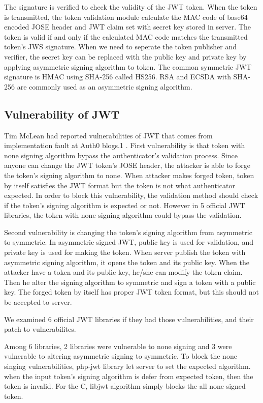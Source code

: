 \documentclass[journal,article,submit,moreauthors,pdftex,10pt,a4paper]{mdpi}
\begin{document}
The signature is verified to check the validity of the JWT token. When the token is transmitted, the token validation module calculate the MAC code of base64 encoded JOSE header and JWT claim set with secret key stored in server. The token is valid if and only if the calculated MAC code matches the transmitted token's JWS signature. When we need to seperate the token publisher and verifier, the secret key can be replaced with the public key and private key by applying asymmetric signing algorithm to token. The common symmetric JWT signature is HMAC using SHA-256 called HS256. RSA and ECSDA with SHA-256 are commonly used as an asymmetric signing algorithm.

\subsection{Vulnerability of JWT}

Tim McLean had reported vulnerabilities of JWT that comes from implementation fault at Auth0 blogs.1 . First vulnerability is that token with none signing algorithm bypass the authenticator's validation process. Since anyone can change the JWT token's JOSE header, the attacker is able to forge the token's signing algorithm to none. When attacker makes forged token, token by itself satisfies the JWT format but the token is not what authenticator expected. In order to block this vulnerability, the validation method should check if the token's signing algorithm is expected or not. However in 5 official JWT libraries, the token with none signing algorithm could bypass the validation.

Second vulnerability is changing the token's signing algorithm from asymmetric to symmetric. In asymmetric signed JWT, public key is used for validation, and private key is used for making the token. When server publish the token with asymmetric signing algorithm, it opens the token and its public key. When the attacker have a token and its public key, he/she can modify the token claim. Then he alter the signing algorithm to symmetric and sign a token with a public key. The forged token by itself has proper JWT token format, but this should not be accepted to server.

We examined 6 official JWT libraries if they had those vulnerabilities, and their patch to vulnerabilites.

Among 6 libraries, 2 libraries were vulnerable to none signing and 3 were vulnerable to altering asymmetric signing to symmetric. To block the none singing vulnerabilities, php-jwt library let server to set the expected algorithm. when the input token's signing algorithm is defer from expected token, then the token is invalid. For the C, libjwt algorithm simply blocks the all none signed token.
\end{document}
